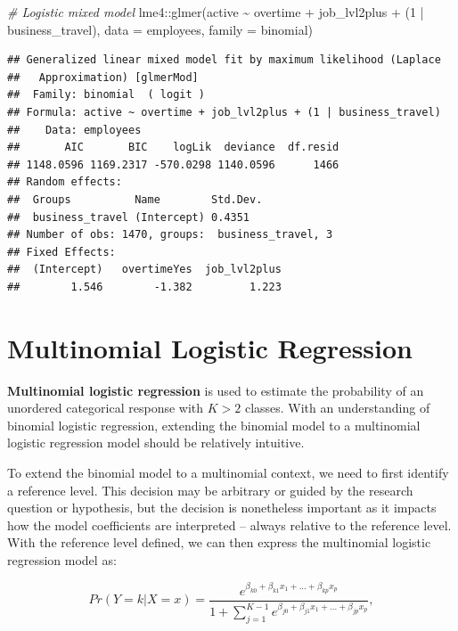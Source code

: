 \documentclass[
]{book}
\newenvironment{Shaded}{\begin{snugshade}}{\end{snugshade}}
\newcommand{\AttributeTok}[1]{\textcolor[rgb]{0.77,0.63,0.00}{#1}}
\newcommand{\CommentTok}[1]{\textcolor[rgb]{0.56,0.35,0.01}{\textit{#1}}}
\newcommand{\DecValTok}[1]{\textcolor[rgb]{0.00,0.00,0.81}{#1}}
\newcommand{\FunctionTok}[1]{\textcolor[rgb]{0.00,0.00,0.00}{#1}}
\newcommand{\NormalTok}[1]{#1}
\newcommand{\SpecialCharTok}[1]{\textcolor[rgb]{0.00,0.00,0.00}{#1}}
\newcommand{\StringTok}[1]{\textcolor[rgb]{0.31,0.60,0.02}{#1}}
\begin{document}
\begin{Shaded}
\begin{Highlighting}[]
\CommentTok{\# Logistic mixed model}
\NormalTok{lme4}\SpecialCharTok{::}\FunctionTok{glmer}\NormalTok{(active }\SpecialCharTok{\textasciitilde{}}\NormalTok{ overtime }\SpecialCharTok{+}\NormalTok{ job\_lvl2plus }\SpecialCharTok{+}\NormalTok{ (}\DecValTok{1} \SpecialCharTok{|}\NormalTok{ business\_travel), }\AttributeTok{data =}\NormalTok{ employees, }\AttributeTok{family =} \StringTok{\textquotesingle{}binomial\textquotesingle{}}\NormalTok{)}
\end{Highlighting}
\end{Shaded}

\begin{verbatim}
## Generalized linear mixed model fit by maximum likelihood (Laplace
##   Approximation) [glmerMod]
##  Family: binomial  ( logit )
## Formula: active ~ overtime + job_lvl2plus + (1 | business_travel)
##    Data: employees
##       AIC       BIC    logLik  deviance  df.resid 
## 1148.0596 1169.2317 -570.0298 1140.0596      1466 
## Random effects:
##  Groups          Name        Std.Dev.
##  business_travel (Intercept) 0.4351  
## Number of obs: 1470, groups:  business_travel, 3
## Fixed Effects:
##  (Intercept)   overtimeYes  job_lvl2plus  
##        1.546        -1.382         1.223
\end{verbatim}

\hypertarget{multinomial-logistic-regression}{%
\section{Multinomial Logistic Regression}\label{multinomial-logistic-regression}}

\textbf{Multinomial logistic regression} is used to estimate the probability of an unordered categorical response with \(K>2\) classes. With an understanding of binomial logistic regression, extending the binomial model to a multinomial logistic regression model should be relatively intuitive.

To extend the binomial model to a multinomial context, we need to first identify a reference level. This decision may be arbitrary or guided by the research question or hypothesis, but the decision is nonetheless important as it impacts how the model coefficients are interpreted -- always relative to the reference level. With the reference level defined, we can then express the multinomial logistic regression model as:

\[ Pr(Y = k | X = x) = \frac{e^{\beta_{k0} + \beta_{k1} x_1 + ... + \beta_{kp} x_p}}{1+ \displaystyle\sum_{j=1}^{K-1} e^{\beta_{j0} + \beta_{j1} x_1 + ... + \beta_{jp} x_p}}, \]
\end{document}
